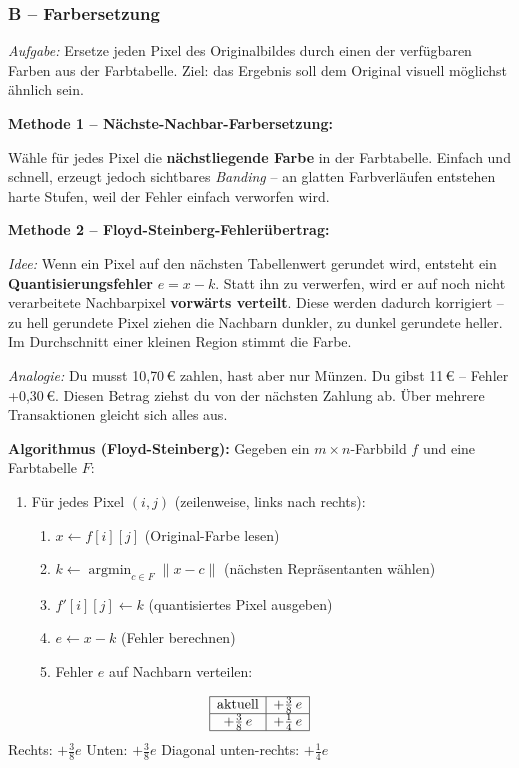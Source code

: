 \documentclass[12pt, a4paper]{article}
\begin{document}
\subsubsection*{B -- Farbersetzung}

\textit{Aufgabe:} Ersetze jeden Pixel des Originalbildes durch einen der verfügbaren Farben aus der Farbtabelle. Ziel: das Ergebnis soll dem Original visuell möglichst ähnlich sein.

\textbf{Methode 1 -- Nächste-Nachbar-Farbersetzung:}

Wähle für jedes Pixel die \textbf{nächstliegende Farbe} in der Farbtabelle. Einfach und schnell, erzeugt jedoch sichtbares \textit{Banding} -- an glatten Farbverläufen entstehen harte Stufen, weil der Fehler einfach verworfen wird.

\textbf{Methode 2 -- Floyd-Steinberg-Fehlerübertrag:}

\textit{Idee:} Wenn ein Pixel auf den nächsten Tabellenwert gerundet wird, entsteht ein \textbf{Quantisierungsfehler} $e = x - k$. Statt ihn zu verwerfen, wird er auf noch nicht verarbeitete Nachbarpixel \textbf{vorwärts verteilt}. Diese werden dadurch korrigiert -- zu hell gerundete Pixel ziehen die Nachbarn dunkler, zu dunkel gerundete heller. Im Durchschnitt einer kleinen Region stimmt die Farbe.

\textit{Analogie:} Du musst 10{,}70\,€ zahlen, hast aber nur Münzen. Du gibst 11\,€ -- Fehler +0{,}30\,€. Diesen Betrag ziehst du von der nächsten Zahlung ab. Über mehrere Transaktionen gleicht sich alles aus.

\begin{definitionbox}
\textbf{Algorithmus (Floyd-Steinberg):} Gegeben ein $m\times n$-Farbbild $f$ und eine Farbtabelle $F$:
\begin{enumerate}
  \item Für jedes Pixel $(i,j)$ (zeilenweise, links nach rechts):
    \begin{enumerate}[label=\alph*.]
      \item $x \leftarrow f[i][j]$ \hfill (Original-Farbe lesen)
      \item $k \leftarrow \operatorname{argmin}_{c\in F}\|x - c\|$ \hfill (nächsten Repräsentanten wählen)
      \item $f'[i][j] \leftarrow k$ \hfill (quantisiertes Pixel ausgeben)
      \item $e \leftarrow x - k$ \hfill (Fehler berechnen)
      \item Fehler $e$ auf Nachbarn verteilen:
    \end{enumerate}
\end{enumerate}
\[
  \begin{array}{|c|c|}
  \hline
  \text{aktuell} & +\tfrac{3}{8}\,e \\
  \hline
  +\tfrac{3}{8}\,e & +\tfrac{1}{4}\,e \\
  \hline
  \end{array}
\]
Rechts: $+\tfrac{3}{8}e$ \quad Unten: $+\tfrac{3}{8}e$ \quad Diagonal unten-rechts: $+\tfrac{1}{4}e$
\end{definitionbox}
\end{document}
